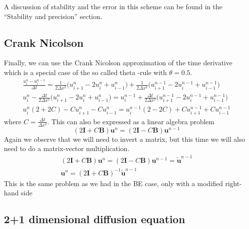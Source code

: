 \documentclass[a4paper,english, 10pt, twoside]{article}
\begin{document}
A discussion of stability and the error in this scheme can be found in the ``Stability and precision'' section.

\subsection{Crank Nicolson}
Finally, we can use the Crank Nicolson approximation of the time derivative which is a special case of the so called theta -rule 
with $\theta = 0.5$.
\begin{align*}
 \frac{u^n_i - u^{n-1}_i}{\Delta t} = \frac{1}{2\Delta x^2}\Big(u^n_{i+1} -2u^n_{i} + u^n_{i-1}\Big) +\frac{1}{2\Delta x^2}
 \Big(u^{n-1}_{i+1} -2u^{n-1}_{i} + u^{n-1}_{i-1}\Big) \\
 u^n_i -\frac{\Delta t}{2\Delta x^2}\Big(u^n_{i+1} -2u^n_{i} + u^n_{i-1}\Big) = u^{n-1}_i + 
 \frac{\Delta t}{2\Delta x^2}\Big(u^{n-1}_{i+1} -2u^{n-1}_{i} + u^{n-1}_{i-1}\Big)\\
 u^n_i(2+2C) - Cu^n_{i+1} - Cu^n_{i-1} = u^{n-1}_i(2-2C) + Cu^{n-1}_{i+1} + Cu^{n-1}_{i-1}
\end{align*}
where $C = \frac{\Delta t}{\Delta x^2}$. This can also be expressed as a linear algebra problem
\begin{equation}\label{CN}
 (2\mathbf{I}+C\mathbf{B})\mathbf{u}^n = (2\mathbf{I}-C\mathbf{B})\mathbf{u}^{n-1}
\end{equation}
Again we observe that we will need to invert a matrix, but this time we will also need to do a matrix-vector multiplication.
\begin{align*}
 (2\mathbf{I}+C\mathbf{B})\mathbf{u}^n = (2\mathbf{I}-C\mathbf{B})\mathbf{u}^{n-1} = \tilde{\mathbf{u}}^{n-1}\\
 \mathbf{u}^n = (2\mathbf{I}+C\mathbf{B})^{-1}\tilde{\mathbf{u}}^{n-1}
\end{align*}
This is the same problem as we had in the BE case, only with a modified right-hand side

\subsection{2+1 dimensional diffusion equation}
\end{document}
